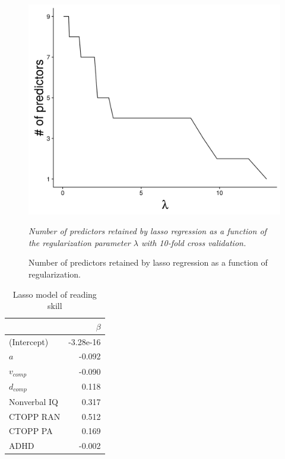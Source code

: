 \documentclass[..\uwthesis.tex]{subfiles}
\begin{document}
\begin{figure}
    \centering
    \caption{Number of predictors retained by lasso regression as a function of regularization.}
    \label{fig:suppb_4}
    \includegraphics[width = 12 cm]{images/appendix_b/S4_lasso_npredictors.png}
    \item \textit{Number of predictors retained by lasso regression as a function of the regularization parameter $\lambda$ with 10-fold cross validation.}
\end{figure}

\begin{table}
\centering
\caption{Lasso model of reading skill}
\label{tab:sb_lasso}
    \begin{tabular}{lr}
    \toprule
      & $\beta$\\
    \midrule
    (Intercept)      & -3.28e-16\\
    $a$              & -0.092\\
    $v_{comp}$       & -0.090\\
    $d_{comp}$       & 0.118\\
    Nonverbal IQ     & 0.317\\
    CTOPP RAN        & 0.512\\
    CTOPP PA         & 0.169\\
    ADHD             & -0.002\\
    \bottomrule
    \end{tabular}
\end{table}
\end{document}
